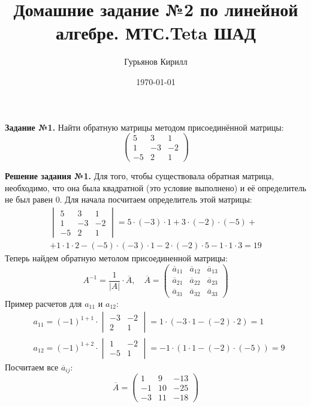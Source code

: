 \documentclass[a4paper, 12pt]{article}
\author{Гурьянов Кирилл}
\title{Домашние задание №2 по линейной алгебре. МТС.Teta ШАД}
\date{\today}
\begin{document}
\textbf{Задание №1.} Найти обратную матрицы методом присоединённой матрицы:
\[
\begin{pmatrix}
    5 & 3 & 1 \\ 
    1 & -3 & -2 \\ 
    -5 & 2 & 1
\end{pmatrix}
\]

\vspace{0.5cm} 

\textbf{Решение задания №1.} Для того, чтобы существовала обратная матрица, необходимо, что она была квадратной (это условие выполнено) и её определитель не был равен $0$. Для начала посчитаем определитель этой матрицы: 
\begin{gather*}
    \begin{vmatrix}
        5 & 3 & 1 \\ 
        1 & -3 & -2 \\ 
        -5 & 2 & 1
    \end{vmatrix} = 5\cdot(-3)\cdot1+3\cdot(-2)\cdot(-5) +\\ 
    +1\cdot1\cdot2-(-5)\cdot(-3)\cdot1-2\cdot(-2)\cdot5-1\cdot1\cdot3 = 19
\end{gather*}
Теперь найдем обратную метолом присоединенной матрицы:
\[
A^{-1} = \frac{1}{|A|} \cdot \overline{A}, \quad
\overline{A} = 
\begin{pmatrix}
    \overline{a}_{11} & \overline{a}_{12} & \overline{a}_{13} \\ 
    \overline{a}_{21} & \overline{a}_{22} & \overline{a}_{23} \\ 
    \overline{a}_{31} & \overline{a}_{32} & \overline{a}_{33}
\end{pmatrix}
\]
Пример расчетов для $a_{11}$ и $a_{12}$:
\begin{align*}
    & a_{11} = (-1)^{1 + 1} \cdot 
    \begin{vmatrix}
        -3 & -2 \\
        2 & 1
    \end{vmatrix} = 1 \cdot (-3 \cdot 1 - (-2) \cdot 2) = 1\\ 
    & a_{12} = (-1)^{1 + 2} \cdot 
    \begin{vmatrix}
        1 & -2 \\
        -5 & 1
    \end{vmatrix} = -1 \cdot (1 \cdot 1 - (-2) \cdot (-5)) = 9
\end{align*}
Посчитаем все $\overline{a}_{ij}$:
\[
\overline{A} = 
\begin{pmatrix}
    1 & 9 & -13  \\
    -1 & 10 & -25 \\ 
    -3 & 11 & -18
\end{pmatrix}
\]
\end{document}
